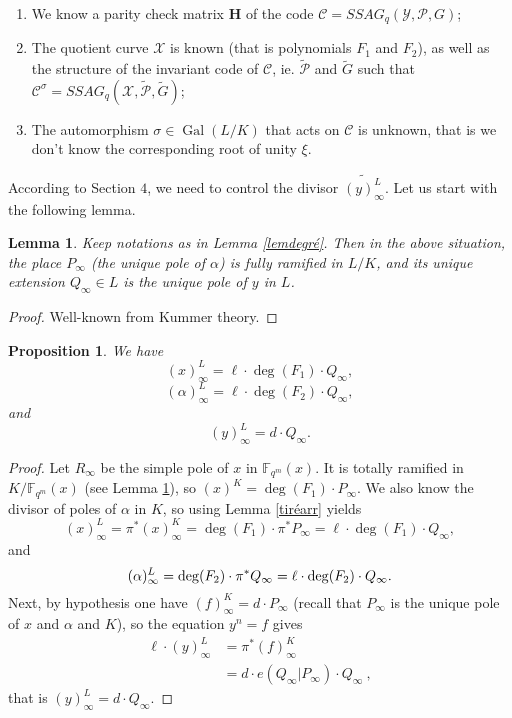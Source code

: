 \documentclass[10pt]{article}
\newtheorem{prop1}[thm]{Proposition}
\newtheorem{lem1}[thm]{Lemma}
\newcommand{\s}{\vspace{0.3cm}}
\newcommand{\cd}{\cdot}
\newcommand{\fqm}{\mathbb{F}_{q^m}}
\newcommand{\X}{\mathcal{X}}
\newcommand{\Y}{\mathcal{Y}}
\newcommand{\PR}{\mathcal{P}}
\newcommand{\Gal}{\operatorname{Gal}}
\begin{document}
\s

\begin{enumerate}
\item We know a parity check matrix $\mathbf{H}$ of the code $\mathcal{C} = SSAG_q(\Y,\PR,G)$;
\item The quotient curve $\X$ is known (that is polynomials $F_1$ and $F_2$), as well as the structure of the invariant code of $\mathcal{C}$, ie. $\tilde{\PR}$ and $\tilde{G}$ such that $\mathcal{C}^{\sigma} = SSAG_q(\X,\tilde{\PR},\tilde{G})$;
\item The automorphism $\sigma \in\Gal(L/K)$ that acts on $\mathcal{C}$ is unknown, that is we don't know the corresponding root of unity $\xi$.
\end{enumerate}

\s


According to Section $4$, we need to control the divisor $\widetilde{(y)^L_{\infty}}$. Let us start with the following lemma.

\s

\begin{lem1} \label{ramification}
Keep notations as in Lemma \ref{lemdegré}. Then in the above situation, the place $P_{\infty}$ (the unique pole of $\alpha$) is fully ramified in $L/K$, and its unique extension $Q_{\infty} \in L$ is the unique pole of $y$ in $L$. 
\end{lem1}

\s

\begin{proof}
Well-known from Kummer theory.
\end{proof}

\s

\begin{prop1} \label{propclé}
We have
\[(x)^L_{\infty} = \ell \cd \deg(F_1) \cd Q_{\infty},\]
\[(\alpha)^L_{\infty} = \ell \cd \deg(F_2) \cd Q_{\infty},\]
and
\[(y)^L_{\infty} = d \cd Q_{\infty}.\]
\end{prop1}

\s

\begin{proof}
Let $R_{\infty}$ be the simple pole of $x$ in $\fqm(x)$. It is totally ramified in $K/\fqm(x)$ (see Lemma \ref{ramification}), so $(x)^K = \deg(F_1) \cd P_{\infty}$. We also know the divisor of poles of $\alpha$ in $K$, so using Lemma \ref{tiréarr} yields
\[(x)^L_{\infty} = \pi^*(x)^K_{\infty} = \deg(F_1) \cd \pi^*P_{\infty} = \ell \cd \deg(F_1) \cd Q_{\infty},\]
and
\[(\alpha)^L_{\infty} = \deg(F_{\rm 2}) \cd \pi^*Q_{\infty} = \ell \cd \deg(F_{\rm 2}) \cd Q_{\infty}.\]
Next, by hypothesis one have $(f)^K_{\infty} = d \cd P_{\infty}$ (recall that $P_{\infty}$ is the unique pole of $x$ and $\alpha$ and $K$), so the equation $y^n=f$ gives
\begin{align*} \ell \cd (y)^L_{\infty} &= \pi^*(f)^K_{\infty} \\
&= d \cd e(Q_{\infty}|P_{\infty}) \cd Q_{\infty} \ ,
\end{align*}
that is $(y)^L_{\infty} = d \cd Q_{\infty}.$
\end{proof}
\end{document}
